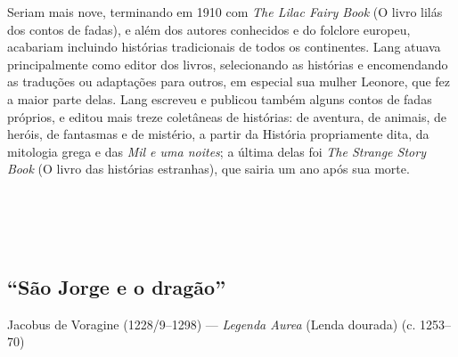 Seriam mais nove, terminando em 1910 com \textit{The Lilac Fairy Book} (O livro
lilás dos contos de fadas), e além dos autores conhecidos e do folclore
europeu, acabariam incluindo histórias tradicionais de todos
os continentes. Lang atuava principalmente como editor dos livros,
selecionando as histórias e encomendando as traduções ou adaptações
para outros, em especial sua mulher Leonore, que fez a maior parte delas.
Lang escreveu e publicou também alguns contos de fadas próprios, e
editou mais treze coletâneas de histórias: de aventura, de animais,
de heróis, de fantasmas e de mistério, a partir da História
propriamente dita, da mitologia grega e das \textit{Mil e uma noites}; a última
delas foi \textit{The Strange Story Book} (O livro das histórias estranhas), 
que sairia um ano após sua morte. 

\chapter*{\ }

\section{“São Jorge e o dragão”}

{\centering
Jacobus de Voragine (1228/9--1298) --- \textit{Legenda Aurea} (Lenda dourada) (c. 1253--70)
\par\smallskip}

